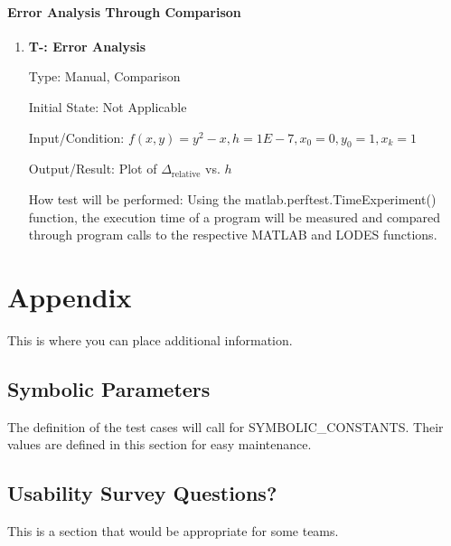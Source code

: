 \documentclass[12pt, titlepage]{article}
\newcounter{tnum} %
\newcommand{\famname}{LODES} %
\begin{document}
\paragraph{Error Analysis Through Comparison}

\begin{enumerate}

\item{\textbf{T-\thetnum \label{t-difference}: Error Analysis}}

Type: Manual, Comparison 
					
Initial State: Not Applicable
					
Input/Condition: $f(x, y) = y^2 - x, h = 1E-7, x_0 = 0, y_0 = 1, x_k = 1$
					
Output/Result: Plot of $\Delta_{\text{relative}}$ vs. $h$

How test will be performed: Using the matlab.perftest.TimeExperiment() function, the execution time of a program will be measured and compared through program calls to the respective MATLAB and \famname{} functions.

\end{enumerate}





\newpage

\section{Appendix}

This is where you can place additional information.

\subsection{Symbolic Parameters}

The definition of the test cases will call for SYMBOLIC\_CONSTANTS.
Their values are defined in this section for easy maintenance.

\subsection{Usability Survey Questions?}

This is a section that would be appropriate for some teams.
\end{document}
